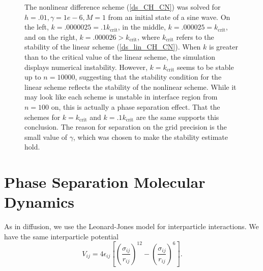 \documentclass[12pt, reqno]{report}
\theoremstyle{definition}
\theoremstyle{remark}
\begin{document}
\begin{figure}[H]
\begin{tabular}{ccc}
    \end{tabular}

    \caption{
        The nonlinear difference scheme (\ref{ds_CH_CN}) was solved for $h=.01,\gamma=1e-6,M=1$ from an initial state of a sine wave. 
        On the left, $k=.0000025=.1k_\text{crit}$, in the middle, $k=.000025=k_\text{crit}$, and on the right, $k=.000026>k_\text{crit}$, where $k_\text{crit}$ refers to the stability of the linear scheme (\ref{ds_lin_CH_CN}). 
        When $k$ is greater than to the critical value of the linear scheme, the simulation displays numerical instability. 
        However, $k=k_\text{crit}$ seems to be stable up to $n=10000$, suggesting that the stability condition for the linear scheme reflects the stability of the nonlinear scheme.
        While it may look like each scheme is unstable in interface region from $n=100$ on, this is actually a phase separation effect.
        That the schemes for $k=k_\text{crit}$ and $k=.1k_\text{crit}$ are the same supports this conclusion.
        The reason for separation on the grid precision is the small value of $\gamma$, which was chosen to make the stability estimate hold.
    }
    \label{fg_nonlinear_stability_implicit_CH}
\end{figure}



\section{Phase Separation Molecular Dynamics} \label{ssec_phase_MD}

As in diffusion, we use the Leonard-Jones model for interparticle interactions. 
We have the same interparticle potential
\begin{equation}
    V_{ij}=4\epsilon_{ij}\left[ \left( \frac{\sigma_{ij}}{r_{ij}} \right)^{12}-\left( \frac{\sigma_{ij}}{r_{ij}} \right)^6 \right].
\end{equation}
\end{document}
